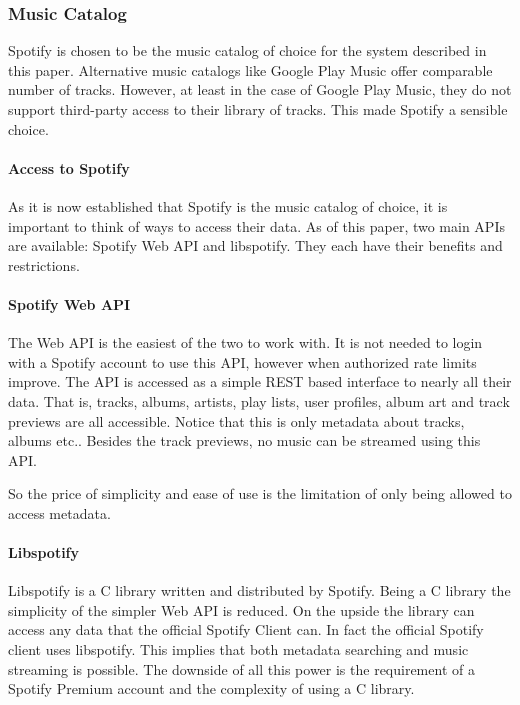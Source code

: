 \subsubsection{Music Catalog}
\label{ssub:Music_catalog}


Spotify is chosen to be the music catalog of choice for the system described in this paper. Alternative music catalogs like Google Play Music offer comparable number of tracks. However, at least in the case of Google Play Music, they do not support third-party access to their library of tracks. This made Spotify a sensible choice.

\paragraph{Access to Spotify}
\label{par:Access_to_Spotify}

As it is now established that Spotify is the music catalog of choice, it is important to think of ways to access their data. As of this paper, two main APIs are available: Spotify Web API and libspotify. They each have their benefits and restrictions.

\paragraph{Spotify Web API}
\label{par:spotify_web_api}

The Web API is the easiest of the two to work with. It is not needed to login with a Spotify account to use this API, however when authorized rate limits improve. The API is accessed as a simple REST based interface to nearly all their data. That is, tracks, albums, artists, play lists, user profiles, album art and track previews are all accessible. Notice that this is only metadata about tracks, albums etc.. Besides the track previews, no music can be streamed using this API.

So the price of simplicity and ease of use is the limitation of only being allowed to access metadata. 

\paragraph{Libspotify}
\label{par:music_catalog_libspotify}

Libspotify is a C library written and distributed by Spotify. Being a C library the simplicity of the simpler Web API is reduced. On the upside the library can access any data that the official Spotify Client can. In fact the official Spotify client uses libspotify. This implies that both metadata searching and music streaming is possible. The downside of all this power is the requirement of a Spotify Premium account and the complexity of using a C library.

